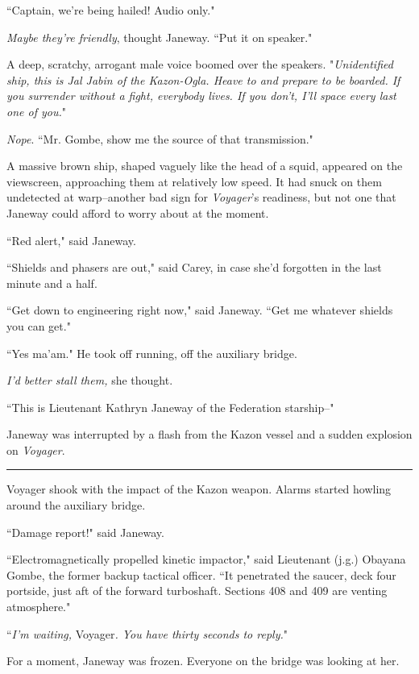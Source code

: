 \documentclass[twoside,letterpaper,12pt]{memoir}
\begin{document}
``Captain, we're being hailed! Audio only."

\textit{Maybe they're friendly}, thought Janeway. ``Put it on speaker."

A deep, scratchy, arrogant male voice boomed over the speakers. "\textit{Unidentified ship, this is Jal Jabin of the Kazon-Ogla. Heave to and prepare to be boarded. If you surrender without a fight, everybody lives. If you don't, I'll space every last one of you.}"

\textit{Nope}. ``Mr. Gombe, show me the source of that transmission."

A massive brown ship, shaped vaguely like the head of a squid, appeared on the viewscreen, approaching them at relatively low speed. It had snuck on them undetected at warp--another bad sign for \textit{Voyager}'s readiness, but not one that Janeway could afford to worry about at the moment.

``Red alert," said Janeway.

``Shields and phasers are out," said Carey, in case she’d forgotten in the last minute and a half.

``Get down to engineering right now," said Janeway. ``Get me whatever shields you can get."

``Yes ma'am." He took off running, off the auxiliary bridge.

\textit{I'd better stall them, }she thought.

``This is Lieutenant Kathryn Janeway of the Federation starship--"

Janeway was interrupted by a flash from the Kazon vessel and a sudden explosion on \textit{Voyager}.

\begin{center}\rule{3cm}{0.4 pt}\end{center}

Voyager shook with the impact of the Kazon weapon. Alarms started howling around the auxiliary bridge.

``Damage report!" said Janeway.

``Electromagnetically propelled kinetic impactor," said Lieutenant (j.g.) Obayana Gombe, the former backup tactical officer. ``It penetrated the saucer, deck four portside, just aft of the forward turboshaft. Sections 408 and 409 are venting atmosphere."

``\textit{I'm waiting, }Voyager\textit{. You have thirty seconds to reply.}"

For a moment, Janeway was frozen. Everyone on the bridge was looking at her.
\end{document}
